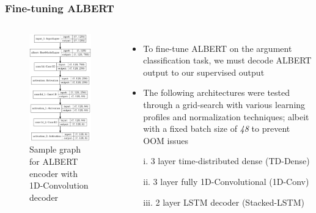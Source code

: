 \documentclass{beamer}
\begin{document}
\subsection{}
\begin{framefont}{\footnotesize}
	\begin{frame}
		\frametitle{Fine-tuning ALBERT}
			\begin{columns}
				\begin{figure}
				    \centering
					\includegraphics[trim={0cm 0cm 0cm 0cm},clip,width=3.5cm]{model.png}
					\captionsetup{justification=centering}
					\caption{Sample graph for ALBERT encoder with 1D-Convolution decoder}
				\end{figure}
				\begin{itemize}
					\setlength\itemsep{1.2em}
					\item To fine-tune ALBERT on the argument classification task, we must decode ALBERT output to our supervised output
					\item The following architectures were tested through a grid-search with various learning profiles and normalization techniques; albeit with a fixed batch size of \textit{48} to prevent OOM issues
					\item[i.] 3 layer time-distributed dense (TD-Dense)
					\item[ii.] 3 layer fully 1D-Convolutional (1D-Conv)
					\item[iii.] 2 layer LSTM decoder (Stacked-LSTM)
				\end{itemize}
			\end{columns}
	\end{frame}
\end{framefont}
\end{document}
